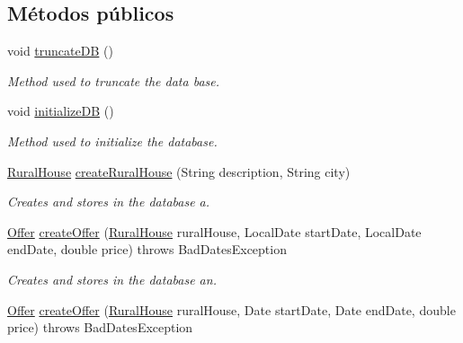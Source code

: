 \subsection*{Métodos públicos}
\begin{DoxyCompactItemize}
\item 
void \mbox{\hyperlink{interfacecom_1_1ruralhousejsf_1_1data_access_1_1_hibernate_data_access_interface_a181eb91e600e57fe36301128022f535d}{truncate\+DB}} ()
\begin{DoxyCompactList}\small\item\em Method used to truncate the data base. \end{DoxyCompactList}\item 
void \mbox{\hyperlink{interfacecom_1_1ruralhousejsf_1_1data_access_1_1_hibernate_data_access_interface_acab426a4933f3510c317816c136cec0b}{initialize\+DB}} ()
\begin{DoxyCompactList}\small\item\em Method used to initialize the database. \end{DoxyCompactList}\item 
\mbox{\hyperlink{classcom_1_1ruralhousejsf_1_1domain_1_1_rural_house}{Rural\+House}} \mbox{\hyperlink{interfacecom_1_1ruralhousejsf_1_1data_access_1_1_hibernate_data_access_interface_a4c8bc4e3b076f4fc75efb878cc2c1c21}{create\+Rural\+House}} (String description, String city)
\begin{DoxyCompactList}\small\item\em Creates and stores in the database a. \end{DoxyCompactList}\item 
\mbox{\hyperlink{classcom_1_1ruralhousejsf_1_1domain_1_1_offer}{Offer}} \mbox{\hyperlink{interfacecom_1_1ruralhousejsf_1_1data_access_1_1_hibernate_data_access_interface_a0fe06262f78319a1fd4c2fd4e9534db8}{create\+Offer}} (\mbox{\hyperlink{classcom_1_1ruralhousejsf_1_1domain_1_1_rural_house}{Rural\+House}} rural\+House, Local\+Date start\+Date, Local\+Date end\+Date, double price)  throws Bad\+Dates\+Exception
\begin{DoxyCompactList}\small\item\em Creates and stores in the database an. \end{DoxyCompactList}\item 
\mbox{\hyperlink{classcom_1_1ruralhousejsf_1_1domain_1_1_offer}{Offer}} \mbox{\hyperlink{interfacecom_1_1ruralhousejsf_1_1data_access_1_1_hibernate_data_access_interface_a31f9cb8a3c8f0b42dee19b03f052cd62}{create\+Offer}} (\mbox{\hyperlink{classcom_1_1ruralhousejsf_1_1domain_1_1_rural_house}{Rural\+House}} rural\+House, Date start\+Date, Date end\+Date, double price)  throws Bad\+Dates\+Exception

\end{DoxyCompactItemize}
